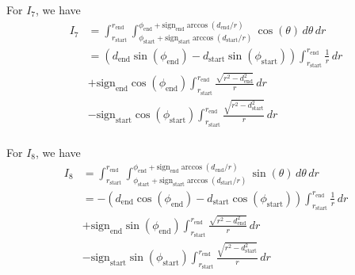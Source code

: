 \documentclass{article}
\numberwithin{equation}{section}
\begin{document}
For $I_7$, we have 
\begin{equation}
\begin{split}
    I_7  & = \int_{r_\mathrm{start}}^{r_\mathrm{end}} \int_{\phi_\mathrm{start} + \mathrm{sign}_\mathrm{start}\arccos\left(d_\mathrm{start}/r\right)}^{\phi_\mathrm{end} + \mathrm{sign}_\mathrm{end}\arccos\left(d_\mathrm{end}/r\right)} \cos(\theta)\, d\theta \, dr \\
    & = (d_\mathrm{end}\sin(\phi_\mathrm{end}) - d_\mathrm{start}\sin(\phi_\mathrm{start})) \int_{r_\mathrm{start}}^{r_\mathrm{end}} \frac{1}{r}\, dr \\
    & + \mathrm{sign}_\mathrm{end}\cos(\phi_\mathrm{end}) \int_{r_\mathrm{start}}^{r_\mathrm{end}} \frac{\sqrt{r^2 - d_\mathrm{end}^2}}{r}\, dr \\
    & - \mathrm{sign}_\mathrm{start}\cos(\phi_\mathrm{start}) \int_{r_\mathrm{start}}^{r_\mathrm{end}} \frac{\sqrt{r^2 - d_\mathrm{start}^2}}{r}\, dr \\
\end{split}
\end{equation}

For $I_8$, we have 
\begin{equation}
\begin{split}
    I_8  & = \int_{r_\mathrm{start}}^{r_\mathrm{end}} \int_{\phi_\mathrm{start} + \mathrm{sign}_\mathrm{start}\arccos\left(d_\mathrm{start}/r\right)}^{\phi_\mathrm{end} + \mathrm{sign}_\mathrm{end}\arccos\left(d_\mathrm{end}/r\right)} \sin(\theta)\, d\theta \, dr \\
    & = - (d_\mathrm{end}\cos(\phi_\mathrm{end}) - d_\mathrm{start}\cos(\phi_\mathrm{start})) \int_{r_\mathrm{start}}^{r_\mathrm{end}} \frac{1}{r}\, dr \\
    & + \mathrm{sign}_\mathrm{end}\sin(\phi_\mathrm{end}) \int_{r_\mathrm{start}}^{r_\mathrm{end}} \frac{\sqrt{r^2 - d_\mathrm{end}^2}}{r}\, dr \\
    & - \mathrm{sign}_\mathrm{start}\sin(\phi_\mathrm{start}) \int_{r_\mathrm{start}}^{r_\mathrm{end}} \frac{\sqrt{r^2 - d_\mathrm{start}^2}}{r}\, dr \\
\end{split}
\end{equation}
\end{document}
